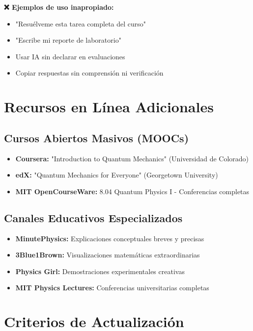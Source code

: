 \begin{tecnologiabox}
\begin{tecnologiabox}
\begin{tecnologiabox}
\begin{consejobox}
	\textbf{❌ Ejemplos de uso inapropiado:}
	\begin{itemize}
		\item "Resuélveme esta tarea completa del curso"
		\item "Escribe mi reporte de laboratorio"
		\item Usar IA sin declarar en evaluaciones
		\item Copiar respuestas sin comprensión ni verificación
	\end{itemize}
\end{consejobox}

\section{Recursos en Línea Adicionales}

\subsection{Cursos Abiertos Masivos (MOOCs)}

\begin{itemize}
	\item \textbf{Coursera:} "Introduction to Quantum Mechanics" (Universidad de Colorado)
	\item \textbf{edX:} "Quantum Mechanics for Everyone" (Georgetown University)
	\item \textbf{MIT OpenCourseWare:} 8.04 Quantum Physics I - Conferencias completas
\end{itemize}

\subsection{Canales Educativos Especializados}

\begin{itemize}
	\item \textbf{MinutePhysics:} Explicaciones conceptuales breves y precisas
	\item \textbf{3Blue1Brown:} Visualizaciones matemáticas extraordinarias
	\item \textbf{Physics Girl:} Demostraciones experimentales creativas
	\item \textbf{MIT Physics Lectures:} Conferencias universitarias completas
\end{itemize}

\section{Criterios de Actualización}


\end{tecnologiabox}
\end{tecnologiabox}
\end{tecnologiabox}

